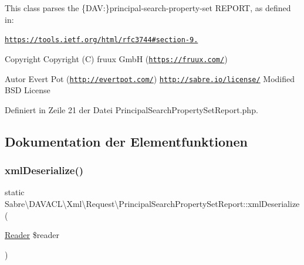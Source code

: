 This class parses the \{D\+AV\+:\}principal-\/search-\/property-\/set R\+E\+P\+O\+RT, as defined in\+:

\href{https://tools.ietf.org/html/rfc3744#section-9.5}{\tt https\+://tools.\+ietf.\+org/html/rfc3744\#section-\/9.}

\begin{DoxyCopyright}{Copyright}
Copyright (C) fruux GmbH (\href{https://fruux.com/}{\tt https\+://fruux.\+com/}) 
\end{DoxyCopyright}
\begin{DoxyAuthor}{Autor}
Evert Pot (\href{http://evertpot.com/}{\tt http\+://evertpot.\+com/})  \href{http://sabre.io/license/}{\tt http\+://sabre.\+io/license/} Modified B\+SD License 
\end{DoxyAuthor}


Definiert in Zeile 21 der Datei Principal\+Search\+Property\+Set\+Report.\+php.



\subsection{Dokumentation der Elementfunktionen}
\mbox{\label{class_sabre_1_1_d_a_v_a_c_l_1_1_xml_1_1_request_1_1_principal_search_property_set_report_aac942dda2c328563364c634768d34a80}} 
\subsubsection{\texorpdfstring{xml\+Deserialize()}{xmlDeserialize()}}
{\footnotesize\ttfamily static Sabre\textbackslash{}\+D\+A\+V\+A\+C\+L\textbackslash{}\+Xml\textbackslash{}\+Request\textbackslash{}\+Principal\+Search\+Property\+Set\+Report\+::xml\+Deserialize (\begin{DoxyParamCaption}\item[{\mbox{\hyperlink{class_sabre_1_1_xml_1_1_reader}{Reader}}}]{\$reader }\end{DoxyParamCaption})\hspace{0.3cm}{\ttfamily [static]}}

